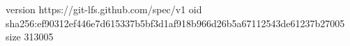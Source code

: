 version https://git-lfs.github.com/spec/v1
oid sha256:ef90312ef446e7d615337b5bf3d1af918b966d26b5a67112543de61237b27005
size 313005
